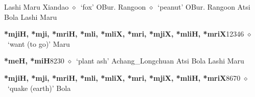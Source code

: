 \begin{list}{}{\leftmargin=1.5em \itemindent=-1.5em}
\hspace{1ex}
         Lashi 
\hspace{1ex}
         Maru 
\hspace{1ex}
         Xiandao 
\hspace{1ex}
         $\diamond$~`fox'
         OBur. 
\hspace{1ex}
         Rangoon 
\hspace{1ex}
         $\diamond$~`peanut'
         OBur. 
\hspace{1ex}
         Rangoon 
\hspace{1ex}
         Atsi 
\hspace{1ex}
         Bola 
\hspace{1ex}
         Lashi 
\hspace{1ex}
         Maru 
  \item {\footnotesize \textbf{*mjiH, *mji, *mriH, *mli, *mliX, *mri, *mjiX, *mliH, *mriX}}{\tiny 12346}
\hspace{1ex}
         $\diamond$~`want (to go)'
         Maru 
  \item {\footnotesize \textbf{*meH, *miH}}{\tiny 8230}
\hspace{1ex}
         $\diamond$~`plant ash'
         Achang\_Longchuan 
\hspace{1ex}
         Atsi 
\hspace{1ex}
         Bola 
\hspace{1ex}
         Lashi 
\hspace{1ex}
         Maru 
  \item {\footnotesize \textbf{*mjiH, *mji, *mriH, *mli, *mliX, *mri, *mjiX, *mliH, *mriX}}{\tiny 8670}
\hspace{1ex}
         $\diamond$~`quake (earth)'
         Bola 

\end{list}
